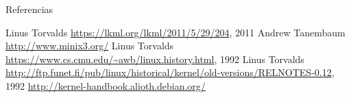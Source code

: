 \begin{frame}{Referencias}
  \begin{thebibliography}{Foo Bar Baz, 1968}\footnotesize
   Linus Torvalds 
    \newblock \url{https://lkml.org/lkml/2011/5/29/204}, 2011
   Andrew Tanembaum  \newblock
    \url{http://www.minix3.org/}
   Linus Torvalds  \newblock
    \url{https://www.cs.cmu.edu/~awb/linux.history.html}, 1992
   Linus Torvalds  \newblock
    \url{http://ftp.funet.fi/pub/linux/historical/kernel/old-versions/RELNOTES-0.12}, 1992
   
    \newblock \url{http://kernel-handbook.alioth.debian.org/}
  \end{thebibliography}
\end{frame}

